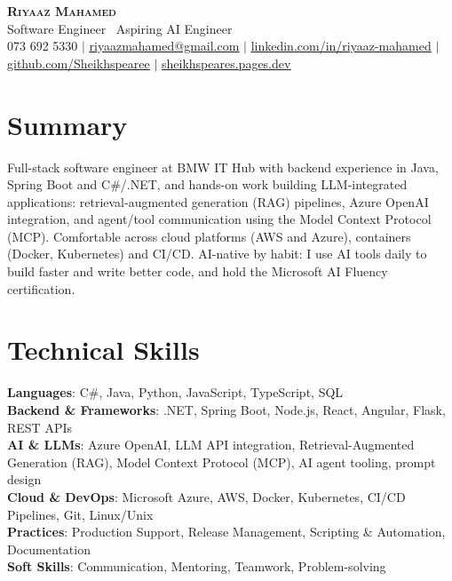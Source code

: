 \documentclass[letterpaper,11pt]{article}
\begin{document}
\begin{center}
    \textbf{\Huge \scshape Riyaaz Mahamed} \\ \vspace{1pt}
    \small Software Engineer \textbar\ Aspiring AI Engineer \\ \vspace{1pt}
    \small 073 692 5330 $|$ \href{mailto:riyaazmahamed@gmail.com}{\underline{riyaazmahamed@gmail.com}} $|$
    \href{https://www.linkedin.com/in/riyaaz-mahamed}{\underline{linkedin.com/in/riyaaz-mahamed}} $|$
    \href{https://github.com/Sheikhspearee}{\underline{github.com/Sheikhspearee}} $|$
    \href{https://sheikhspeares.pages.dev}{\underline{sheikhspeares.pages.dev}}
\end{center}

\section{Summary}
\small{Full-stack software engineer at BMW IT Hub with backend experience in Java, Spring Boot and C\#/.NET, and hands-on work building LLM-integrated applications: retrieval-augmented generation (RAG) pipelines, Azure OpenAI integration, and agent/tool communication using the Model Context Protocol (MCP). Comfortable across cloud platforms (AWS and Azure), containers (Docker, Kubernetes) and CI/CD. AI-native by habit: I use AI tools daily to build faster and write better code, and hold the Microsoft AI Fluency certification.}

\section{Technical Skills}
 \begin{itemize}[leftmargin=0.15in, label={}]
    \small{\item{
     \textbf{Languages}{: C\#, Java, Python, JavaScript, TypeScript, SQL} \\
     \textbf{Backend \& Frameworks}{: .NET, Spring Boot, Node.js, React, Angular, Flask, REST APIs} \\
     \textbf{AI \& LLMs}{: Azure OpenAI, LLM API integration, Retrieval-Augmented Generation (RAG), Model Context Protocol (MCP), AI agent tooling, prompt design} \\
     \textbf{Cloud \& DevOps}{: Microsoft Azure, AWS, Docker, Kubernetes, CI/CD Pipelines, Git, Linux/Unix} \\
     \textbf{Practices}{: Production Support, Release Management, Scripting \& Automation, Documentation} \\
     \textbf{Soft Skills}{: Communication, Mentoring, Teamwork, Problem-solving}
    }}
 \end{itemize}
\end{document}
